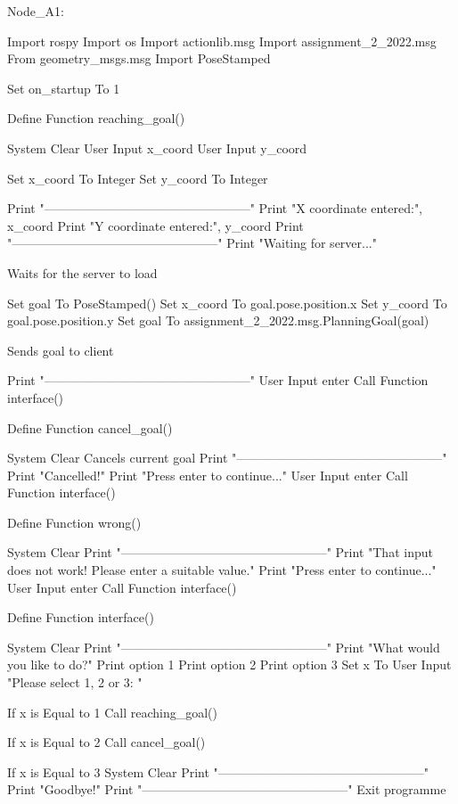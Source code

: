Node\+\_\+\+A1\+: \begin{DoxyVerb}Import rospy
Import os
Import actionlib.msg
Import assignment_2_2022.msg
From geometry_msgs.msg Import PoseStamped

Set on_startup To 1

Define Function reaching_goal()

    System Clear
    User Input x_coord
    User Input y_coord

    Set x_coord To Integer
    Set y_coord To Integer

    Print "--------------------------------------------------"
    Print "X coordinate entered:", x_coord
    Print "Y coordinate entered:", y_coord
    Print "--------------------------------------------------"
    Print "Waiting for server..."

    Waits for the server to load

    Set goal To PoseStamped()
    Set x_coord To goal.pose.position.x
    Set y_coord To goal.pose.position.y
    Set goal To assignment_2_2022.msg.PlanningGoal(goal)

    Sends goal to client

    Print "--------------------------------------------------"
    User Input enter
    Call Function interface()

Define Function cancel_goal()

    System Clear
    Cancels current goal
    Print "--------------------------------------------------"
    Print "Cancelled!"
    Print "Press enter to continue..."
    User Input enter
    Call Function interface()

Define Function wrong()

    System Clear
    Print "--------------------------------------------------"
    Print "That input does not work! Please enter a suitable value."
    Print "Press enter to continue..."
    User Input enter
    Call Function interface()

Define Function interface()

    System Clear
    Print "--------------------------------------------------"
    Print "What would you like to do?"
    Print option 1
    Print option 2
    Print option 3
    Set x To User Input "Please select 1, 2 or 3: "

    If x is Equal to 1
        Call reaching_goal()

    If x is Equal to 2
        Call cancel_goal()

    If x is Equal to 3
        System Clear
        Print "--------------------------------------------------"
        Print "Goodbye!"
        Print "--------------------------------------------------"
        Exit programme


\end{DoxyVerb}
